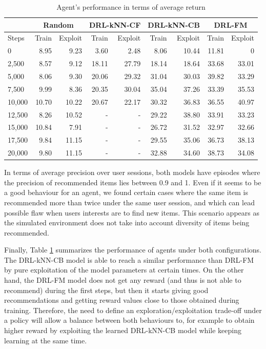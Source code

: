 \begin{table}[t]
\centering
\begin{tabular}{ |l|r|r|r|r|r|r|r|r| }
  \hline
  & \multicolumn{2}{|c|}{\textbf{Random}} & \multicolumn{2}{|c|}{\textbf{DRL-kNN-CF}} & \multicolumn{2}{|c|}{\textbf{DRL-kNN-CB}} & \multicolumn{2}{|c|}{\textbf{DRL-FM}}\\
  \hline \hline
  Steps & Train & Exploit & Train & Exploit & Train & Exploit & Train & Exploit \\
  \hline \hline
  0 & 8.95 & 9.23 & 3.60 & 2.48 & 8.06 & 10.44 & 11.81 & 0 \\
  2,500 & 8.57 & 9.12 & 18.11 & 27.79 & 18.14 & 18.64 & 33.68 & 33.01 \\
  5,000 & 8.06 & 9.30 & 20.06 & 29.32 & 31.04 & 30.03 & 39.82 & 33.29 \\
  7,500 & 9.99 & 8.36 & 20.35 & 30.04 & 35.04 & 37.26 & 33.39 & 35.53 \\
  10,000 & 10.70 & 10.22 & 20.67 & 22.17 & 30.32 & 36.83 & 36.55 & 40.97 \\
  12,500 & 8.26 & 10.52 & - & - & 29.22 & 38.80 & 33.91 & 33.23 \\
  15,000 & 10.84 & 7.91 & - & - & 26.72 & 31.52 & 32.97 & 32.66 \\
  17,500 & 9.84 & 11.15 & - & - & 29.55 & 35.06 & 36.73 & 38.13 \\
  20,000 & 9.80 & 11.15 & - & - & 32.88 & 34.60 & 38.73 & 34.08 \\
  \hline
\end{tabular}
\caption{Agent's performance in terms of average return}
\label{table:return_table}
\end{table}

In terms of average precision over user sessions, both models have episodes where the precision of recommended items lies between 0.9 and 1. Even if it seems to be a good behaviour for an agent, we found certain cases where the same item is recommended more than twice under the same user session, and which can lead possible flaw when users interests are to find new items. This scenario appears as the simulated environment does not take into account diversity of items being recommended.

Finally, Table \ref{table:return_table} summarizes the performance of agents under both configurations. The DRL-kNN-CB model is able to reach a similar performance than DRL-FM by pure exploitation of the model parameters at certain times. On the other hand, the DRL-FM model does not get any reward (and thus is not able to recommend) during the first steps, but then it starts giving good recommendations and getting reward values close to those obtained during training. Therefore, the need to define an exploration/exploitation trade-off under a policy will allow a balance between both behaviours to, for example to obtain higher reward by exploiting the learned DRL-kNN-CB model while keeping learning at the same time.

